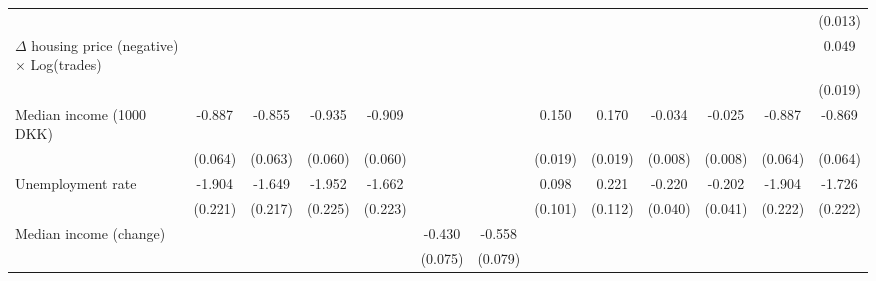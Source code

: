 \begin{sidewaystable}[htbp]
\begin{tabular}{l*{12}{c}}
                    &                    &                    &                    &                    &                    &                    &                    &                    &                    &                    &                    &     (0.013)        \\
$\Delta$ housing price (negative) $\times$ Log(trades)&                    &                    &                    &                    &                    &                    &                    &                    &                    &                    &                    &       0.049\sym{*} \\
                    &                    &                    &                    &                    &                    &                    &                    &                    &                    &                    &                    &     (0.019)        \\
Median income (1000 DKK)&      -0.887\sym{**}&      -0.855\sym{**}&      -0.935\sym{**}&      -0.909\sym{**}&                    &                    &       0.150\sym{**}&       0.170\sym{**}&      -0.034\sym{**}&      -0.025\sym{**}&      -0.887\sym{**}&      -0.869\sym{**}\\
                    &     (0.064)        &     (0.063)        &     (0.060)        &     (0.060)        &                    &                    &     (0.019)        &     (0.019)        &     (0.008)        &     (0.008)        &     (0.064)        &     (0.064)        \\
Unemployment rate   &      -1.904\sym{**}&      -1.649\sym{**}&      -1.952\sym{**}&      -1.662\sym{**}&                    &                    &       0.098        &       0.221\sym{*} &      -0.220\sym{**}&      -0.202\sym{**}&      -1.904\sym{**}&      -1.726\sym{**}\\
                    &     (0.221)        &     (0.217)        &     (0.225)        &     (0.223)        &                    &                    &     (0.101)        &     (0.112)        &     (0.040)        &     (0.041)        &     (0.222)        &     (0.222)        \\
Median income (change)&                    &                    &                    &                    &      -0.430\sym{**}&      -0.558\sym{**}&                    &                    &                    &                    &                    &                    \\
                    &                    &                    &                    &                    &     (0.075)        &     (0.079)        &                    &                    &                    &                    &                    &                    \\

\end{tabular}
\end{sidewaystable}
